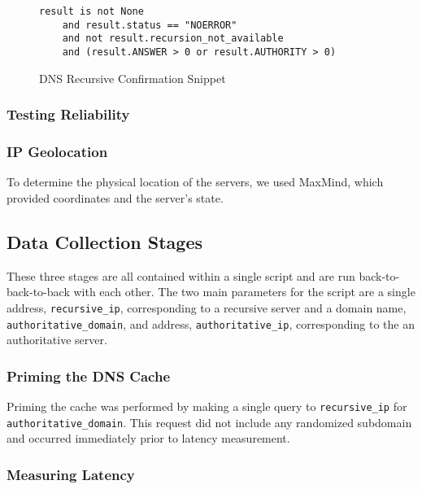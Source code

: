 \begin{figure}[H]
\centering
    \begin{verbatim}
result is not None 
    and result.status == "NOERROR" 
    and not result.recursion_not_available 
    and (result.ANSWER > 0 or result.AUTHORITY > 0)
    \end{verbatim}
    \caption{DNS Recursive Confirmation Snippet}
    \label{fig:rec_conf_snippet}
\end{figure}

\subsubsection{Testing Reliability}


\subsubsection{IP Geolocation}

To determine the physical location of the \dns servers, we used MaxMind, which provided coordinates and the server's state.

\subsection{Data Collection Stages}

These three stages are all contained within a single script and are run back-to-back-to-back with each other. The two main parameters for the script are a single \ip address, \texttt{recursive\_ip}, corresponding to a recursive server and a domain name, \texttt{authoritative\_domain}, and \ip address, \texttt{authoritative\_ip}, corresponding to the an authoritative server.

\subsubsection{Priming the DNS Cache}

Priming the \dns cache was performed by making a single \dns query to \texttt{recursive\_ip} for \texttt{authoritative\_domain}. This request did not include any randomized subdomain and occurred immediately prior to latency measurement.

\subsubsection{Measuring Latency}

